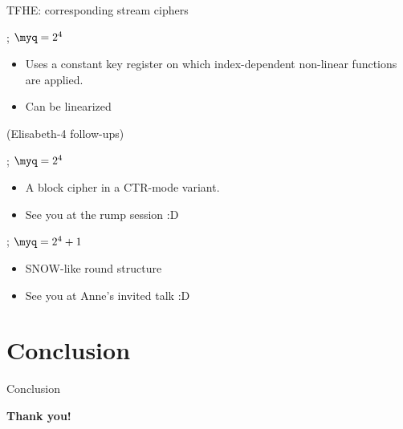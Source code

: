 \documentclass[presentation,aspectratio=1610]{beamer}
\begin{document}
\begin{frame}{TFHE: corresponding stream ciphers}
  \begin{description}
    \setlength\itemsep{0.3cm}
  \item[Elisabeth-4] \cite{AC:CHMS22} ; $\myq = 2^4$
    \begin{itemize}
    \item Uses a constant key register on which index-dependent non-linear functions are applied.
    \item Can be linearized~\cite{AC:GBJR23}
    \end{itemize}
    \pause
    
  \item[Gabriel...] \cite{INDOCRYPT:HofMeaSta23}  (Elisabeth-4 follow-ups)
    \pause
    
  \item[FRAST] \cite{ToSC:CCHLOS24} ; $\myq = 2^4$
    \begin{itemize}
    \item A block cipher in a CTR-mode variant.
    \item {\color{darkgreen}See you at the rump session :D}
    \end{itemize}
    \pause
    
  \item[Transistor] \cite{EPRINT:Transistor} ; $\myq = 2^4+1$
    \begin{itemize}
    \item SNOW-like round structure
    \item {\color{darkgreen}See you at Anne's invited talk :D} \pause
    \end{itemize}
  \end{description}
\end{frame}


\section{Conclusion}

\begin{frame}{Conclusion}
  \pause\vspace{1cm}
  
  \begin{center}
    \textbf{Thank you!}
  \end{center}
\end{frame}

\appendix



\end{document}
